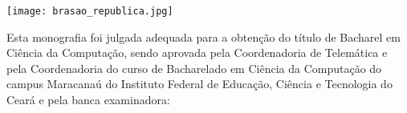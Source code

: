 \begin{folhadeaprovacao}
    \begin{center}
        \texttt{[image: brasao\_republica.jpg]} \\
        \vspace{.5cm}
        {\ABNTEXchapterfont\large\imprimirinstituicao}
        \vspace{1cm}

        {\ABNTEXchapterfont\large\imprimirautor}


    \end{center}

    \noindent Esta monografia foi julgada adequada para a obtenção do título de Bacharel em Ciência da Computação, sendo aprovada pela Coordenadoria de Telemática e pela Coordenadoria do curso de Bacharelado em Ciência da Computação do campus Maracanaú do Instituto Federal de Educação, Ciência e Tecnologia do Ceará e pela banca examinadora:

    \vfill

    \begin{center}

            \if \imprimircoorientador
            \else
            \fi

            \if \nomeprofessorA \instituicaoprofessorA
            \else
            \assinatura{\textbf{\imprimirnomeprofessorA}  \\ \imprimirinstituicaoprofessorA}
            \fi


\end{center}
\end{folhadeaprovacao}
